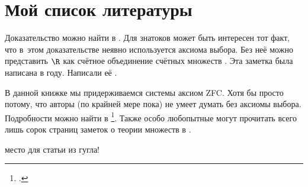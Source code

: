 \documentclass[12pt, a4paper]{article}
\begin{document}
\section{Мой список литературы} 

Доказательство можно найти в \cite{Shan:sets}. Для знатоков может быть интересен тот факт, что в~этом доказательстве неявно используется аксиома выбора. Без неё можно представить $\R$ как счётное объединение счётных множеств \parencite{williams:wto}. Эта заметка была написана в \citeyear{williams:wto} году. Написали её \citeauthor{williams:wto}.

В данной книжке мы придерживаемся системы аксиом ZFC. Хотя бы просто потому, что авторы (по крайней мере пока) не умеет думать без аксиомы выбора. Подробности можно найти в \footcite{herrlich:axiom}. Также особо любопытные могут прочитать всего лишь сорок страниц заметок о теории множеств в \textcite{Franclin:sets}.

\nocite{*}    место для статьи из гугла!


\printbibliography[title={Чтиво}]
\end{document}
